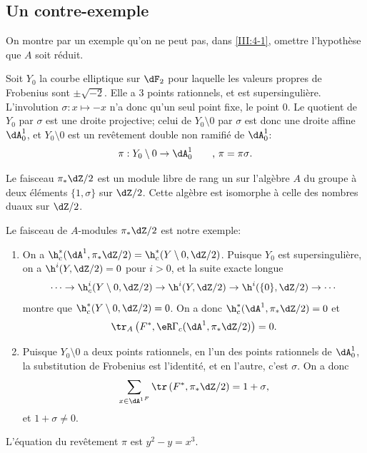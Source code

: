 \subsection{Un contre-exemple}\label{III:4-5}

On montre par un exemple qu'on ne peut pas, dans \ref{III:4-1}, omettre 
l'hypothèse que $A$ soit réduit.

Soit $Y_0$ la courbe elliptique sur $\dF_2$ pour laquelle les valeurs propres 
de Frobenius sont $\pm \sqrt{-2}$. Elle a $3$ points rationnels, et est 
supersingulière. L'involution $\sigma:x\mapsto -x$ n'a donc qu'un seul point 
fixe, le point $0$. Le quotient de $Y_0$ par $\sigma$ est une droite projective; 
celui de $Y_0\setminus 0$ par $\sigma$ est donc une droite affine $\dA_0^1$, et 
$Y_0\setminus 0$ est un revêtement double non ramifié de $\dA_0^1$:
\[
  \pi:Y_0\setminus 0 \to \dA_0^1 \qquad \text{, $\pi=\pi\sigma$.}
\]

Le faisceau $\pi_*\dZ/2$ est un module libre de rang un sur l'algèbre $A$ du 
groupe à deux éléments $\{1,\sigma\}$ sur $\dZ/2$. Cette algèbre est 
isomorphe à celle des nombres duaux sur $\dZ/2$. 

Le faisceau de $A$-modules $\pi_*\dZ/2$ est notre exemple:
\begin{enumerate}[\indent a)]
  \item On a 
    $\h_c^*(\dA^1,\pi_*\dZ/2) = \h_c^*(Y\setminus 0,\dZ/2)$. 
    Puisque $Y_0$ est supersingulière, on a $\h^i(Y,\dZ/2)=0$ pour $i>0$, et 
    la suite exacte longue 
    \[
      \cdots \to \h_c^i(Y\setminus 0,\dZ/2) \to \h^i(Y,\dZ/2) \to \h^i(\{0\},\dZ/2) \to \cdots
    \]
    montre que $\h_c^*(Y\setminus 0,\dZ/2)=0$. On a donc 
    $\h_c^*(\dA^1,\pi_*\dZ/2)=0$ et 
    \[
      \tr_A\left(F^*,\eR\Gamma_c(\dA^1,\pi_*\dZ/2)\right) = 0 \text{.}
    \]
  \item Puisque $Y_0\setminus 0$ a deux points rationnels, en l'un des points 
    rationnels de $\dA_0^1$, la substitution de Frobenius est l'identité, et 
    en l'autre, c'est $\sigma$. On a donc 
    \[
      \sum_{x\in {\dA^1}^F} \tr\left(F^*,\pi_*\dZ/2\right) = 1+\sigma \text{,}
    \]
    et $1+\sigma\ne 0$.
\end{enumerate}

L'équation du revêtement $\pi$ est $y^2-y=x^3$.